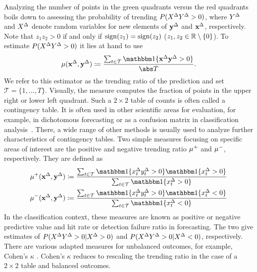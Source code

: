 Analyzing the number of points in the green quadrants versus the red quadrants boils down to assessing the probability of trending $P(X^{\Delta} Y^{\Delta} > 0)$, where $Y^{\Delta}$ and $X^{\Delta}$ denote random variables for new elements of $\mathbf{y}^{\Delta}$ and $\mathbf{x}^{\Delta}$, respectively. 
Note that $z_1 z_2 > 0$ if and only if $\operatorname{sign}(z_1) = \operatorname{sign}(z_2)$ ($z_1, z_2 \in \mathbb{R} \setminus \{ 0 \}$).
To estimate $P(X^{\Delta} Y^{\Delta} > 0)$ it lies at hand to use
\begin{equation}
    \acc (\diffx, \diffy) \coloneqq \frac{\sum_{t \in \mathcal{T}} \ind{\diffx \diffy > 0}}{\card{T}}.\label{eq:acc}
\end{equation}
We refer to this estimator as the trending ratio of the prediction and set $\mathcal{T} = \{1, \dots, T\}$.
Visually, the measure computes the fraction of points in the upper right or lower left quadrant.
Such a $2 \times 2$ table of counts is often called a contingency table. It is often used in other scientific areas for evaluation, for example, in dichotomous forecasting or as a confusion matrix in classification analysis~\parencites(see, e.g., the introductions in)()[Ch. 4]{James2021}[Ch. 3]{Jolliffe2012}.
There, a wide range of other methods is usually used to analyze further characteristics of contingency tables.
Two simple measures focusing on specific areas of interest are the positive and negative trending ratio $\mu^+$ and $\mu^-$, respectively.
They are defined as
\begin{align}
    \accp (\diffx, \diffy) &\coloneqq \frac{\sum_{t \in \mathcal{T}} \ind{\diffxt \diffyt > 0} \ind{\diffxt > 0}}{\sum_{t \in \mathcal{T}} \ind{\diffxt > 0}} \label{eq:accp}\\
    \accm (\diffx, \diffy) &\coloneqq \frac{\sum_{t \in \mathcal{T}} \ind{\diffxt \diffyt > 0} \ind{\diffxt < 0}}{\sum_{t \in \mathcal{T}} \ind{\diffxt < 0}}\label{eq:accm}
\end{align}
In the classification context, these measures are known as positive or negative predictive value and hit rate or detection failure ratio in forecasting.
The two give estimates of $P(X^{\Delta} Y^{\Delta} > 0 | X^{\Delta} > 0)$ and $P(X^{\Delta} Y^{\Delta} > 0 | X^{\Delta} < 0)$, respectively.
There are various adapted measures for unbalanced outcomes, for example, Cohen's $\kappa$ .
Cohen's $\kappa$ reduces to rescaling the trending ratio in the case of a $2\times2$ table and balanced outcomes.
